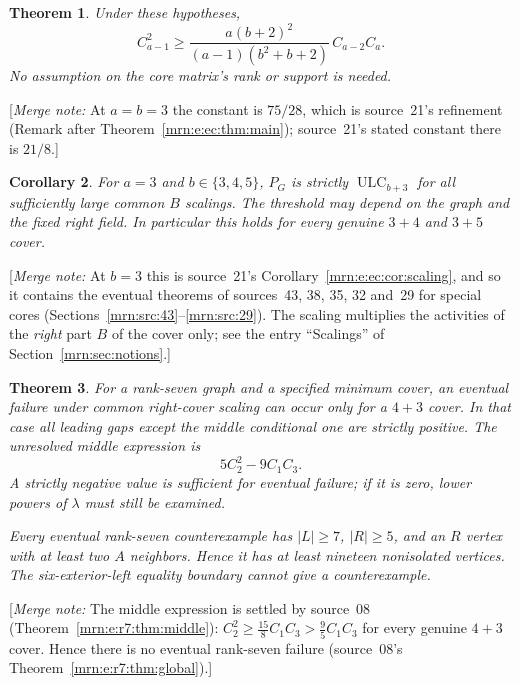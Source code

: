 \documentclass[11pt,a4paper]{article}
\newtheorem{theorem}{Theorem}[section]
\newtheorem{corollary}[theorem]{Corollary}
\theoremstyle{remark}\newtheorem{remark}[theorem]{Remark}
\newcommand{\ULC}{\operatorname{ULC}}      %
\newcommand{\mnote}[1]{[\textit{Merge note:} #1]}
\begin{document}
\begin{theorem}\label{mrn:e:tg:thm:top}
Under these hypotheses,
\begin{equation}\label{mrn:e:tg:eq:top}
 C_{a-1}^2\ge
 \frac{a(b+2)^2}{(a-1)(b^2+b+2)}\,C_{a-2}C_a.
\end{equation}
No assumption on the core matrix's rank or support is needed.
\end{theorem}
\mnote{At $a=b=3$ the constant is $75/28$, which is source~21's refinement (Remark after Theorem~\ref{mrn:e:ec:thm:main}); source~21's stated constant there is $21/8$.}

\begin{corollary}\label{mrn:e:tg:cor:cubic}
For $a=3$ and $b\in\{3,4,5\}$, $P_G$ is strictly $\ULC_{b+3}$ for all sufficiently large common $B$ scalings. The threshold may depend on the graph and the fixed right field. In particular this holds for every genuine $3+4$ and $3+5$ cover.
\end{corollary}
\mnote{At $b=3$ this is source~21's Corollary~\ref{mrn:e:ec:cor:scaling}, and so it contains the eventual theorems of sources~43, 38, 35, 32 and~29 for special cores (Sections~\ref{mrn:src:43}--\ref{mrn:src:29}). The scaling multiplies the activities of the \emph{right} part $B$ of the cover only; see the entry ``Scalings'' of Section~\ref{mrn:sec:notions}.}

\begin{theorem}\label{mrn:e:tg:thm:rankseven}
For a rank-seven graph and a specified minimum cover, an eventual failure under common right-cover scaling can occur only for a $4+3$ cover. In that case all leading gaps except the middle conditional one are strictly positive. The unresolved middle expression is
\begin{equation}\label{mrn:e:tg:eq:middle}
 5C_2^2-9C_1C_3.
\end{equation}
A strictly negative value is sufficient for eventual failure; if it is zero, lower powers of $\lambda$ must still be examined.

Every eventual rank-seven counterexample has $|L|\ge7$, $|R|\ge5$, and an $R$ vertex with at least two $A$ neighbors. Hence it has at least nineteen nonisolated vertices. The six-exterior-left equality boundary cannot give a counterexample.
\end{theorem}
\mnote{The middle expression is settled by source~08 (Theorem~\ref{mrn:e:r7:thm:middle}): $C_2^2\ge\frac{15}{8}C_1C_3>\frac95C_1C_3$ for every genuine $4+3$ cover. Hence there is no eventual rank-seven failure (source~08's Theorem~\ref{mrn:e:r7:thm:global}).}
\end{document}
